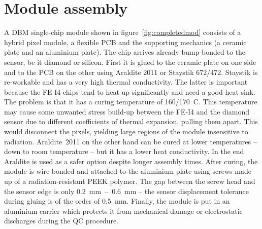 \section{Module assembly}
\label{sec:modass}

A DBM single-chip module shown in figure~\ref{fig:completedmod} consists of a hybrid pixel module, a flexible PCB and the supporting mechanics (a ceramic plate and an aluminium plate). The chip arrives already bump-bonded to the sensor, be it diamond or silicon. First it is glued to the ceramic plate on one side and to the PCB on the other using Araldite 2011 or Staystik 672/472. 
Staystik is re-workable and has a very high thermal conductivity. The latter is important because the FE-I4 chips tend to heat up significantly and need a good heat sink. The problem is that it has a curing temperature of 160/170~\textdegree C. This temperature may cause some unwanted stress build-up between the FE-I4 and the diamond sensor due to different coefficients of thermal expansion, pulling them apart. This would disconnect the pixels, yielding large regions of the module insensitive to radiation. Araldite~2011 on the other hand can be cured at lower temperatures -- down to room temperature -- but it has a lower heat conductivity. In the end Araldite is used as a safer option despite longer assembly times. After curing, the module is wire-bonded and attached to the aluminium plate using screws made up of a radiation-resistant PEEK polymer. The gap between the screw head and the sensor edge is only 0.2~mm~--~0.6~mm -- the sensor displacement tolerance during gluing is of the order of 0.5~mm. Finally, the module is put in an aluminium carrier which protects it from mechanical damage or electrostatic discharges during the QC procedure.


